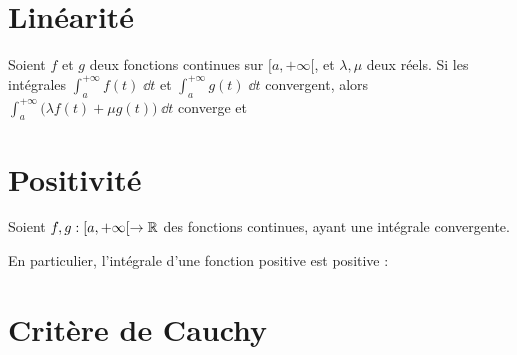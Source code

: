 \section*{Linéarité}

\begin{frame}
\begin{proposition}
\label{prop:lineariteintegralescv}
Soient $f$ et $g$ deux fonctions continues sur
$[a,+\infty[$, et $\lambda,\mu$ deux réels. Si
les intégrales $\int_a^{+\infty} f(t)\;\dd t$ et 
$\int_a^{+\infty} g(t)\;\dd t$ convergent, alors 
$\int_a^{+\infty} \big(\lambda f(t)+\mu g(t)\big)\;\dd t$ converge et
\end{proposition}
\end{frame}


\section*{Positivité}

\begin{frame}
\begin{proposition}
Soient $f,g : [a,+\infty[ \to \mathbb{R}$ des fonctions continues, ayant une intégrale convergente.
\end{proposition} \pause

\bigskip

En particulier, l'intégrale d'une fonction positive est positive :

\end{frame}

\section*{Critère de Cauchy}

